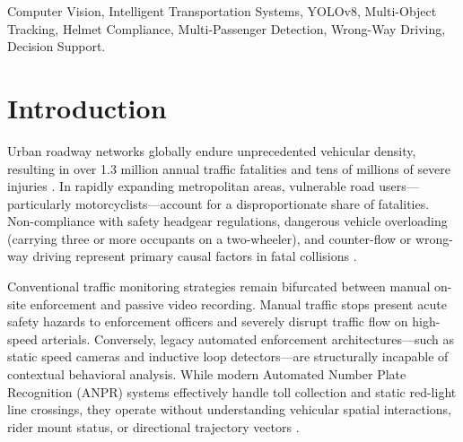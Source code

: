 \documentclass[conference]{IEEEtran}
\begin{document}
\begin{IEEEkeywords}
Computer Vision, Intelligent Transportation Systems, YOLOv8, Multi-Object Tracking, Helmet Compliance, Multi-Passenger Detection, Wrong-Way Driving, Decision Support.
\end{IEEEkeywords}

\section{Introduction}
Urban roadway networks globally endure unprecedented vehicular density, resulting in over 1.3 million annual traffic fatalities and tens of millions of severe injuries \cite{who2023global}. In rapidly expanding metropolitan areas, vulnerable road users---particularly motorcyclists---account for a disproportionate share of fatalities. Non-compliance with safety headgear regulations, dangerous vehicle overloading (carrying three or more occupants on a two-wheeler), and counter-flow or wrong-way driving represent primary causal factors in fatal collisions \cite{sengar2021intelligent}.

Conventional traffic monitoring strategies remain bifurcated between manual on-site enforcement and passive video recording. Manual traffic stops present acute safety hazards to enforcement officers and severely disrupt traffic flow on high-speed arterials. Conversely, legacy automated enforcement architectures---such as static speed cameras and inductive loop detectors---are structurally incapable of contextual behavioral analysis. While modern Automated Number Plate Recognition (ANPR) systems effectively handle toll collection and static red-light line crossings, they operate without understanding vehicular spatial interactions, rider mount status, or directional trajectory vectors \cite{sengar2021intelligent}.
\end{document}
